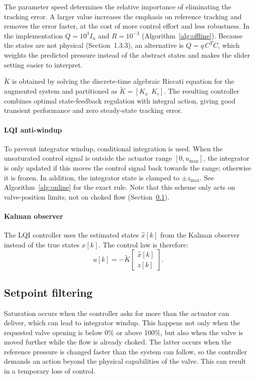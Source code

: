 \documentclass[12pt,a4paper]{article}
\begin{document}
The parameter $\text{speed}$ determines the relative importance of eliminating the tracking error. A larger value increases the emphasis on reference tracking and removes the error faster, at the cost of more control effort and less robustness. In the implementation $Q = 10^3 I_n$ and $R = 10^{-3}$ (Algorithm~\ref{alg:offline}). Because the states are not physical (Section~1.3.3), an alternative is $Q = q\,C^T C$, which weights the predicted pressure instead of the abstract states and makes the slider setting easier to interpret.

$\tilde{K}$ is obtained by solving the discrete-time algebraic Riccati equation for the augmented system and partitioned as $\tilde{K} = [K_x \;\, K_i]$. The resulting controller combines optimal state-feedback regulation with integral action, giving good transient performance and zero steady-state tracking error.

\paragraph{LQI anti-windup}
To prevent integrator windup, conditional integration is used. When the unsaturated control signal is outside the actuator range $[0, u_{\max}]$, the integrator is only updated if this moves the control signal back towards the range; otherwise it is frozen. In addition, the integrator state is clamped to $\pm z_{\max}$. See Algorithm~\ref{alg:online} for the exact rule. Note that this scheme only acts on valve-position limits, not on choked flow (Section~\ref{sec:setpoint_filter}).

\paragraph{Kalman observer}
The LQI controller uses the estimated states $\hat{x}[k]$ from the Kalman observer instead of the true states $x[k]$. The control law is therefore:
\begin{equation}
u[k] = -\tilde{K} \begin{bmatrix} \hat{x}[k] \\ z[k] \end{bmatrix}.
\end{equation}

\subsection{Setpoint filtering}
\label{sec:setpoint_filter}
Saturation occurs when the controller asks for more than the actuator can deliver, which can lead to integrator windup. This happens not only when the requested valve opening is below 0\% or above 100\%, but also when the valve is moved further while the flow is already choked. The latter occurs when the reference pressure is changed faster than the system can follow, so the controller demands an action beyond the physical capabilities of the valve. This can result in a temporary loss of control.
\end{document}
